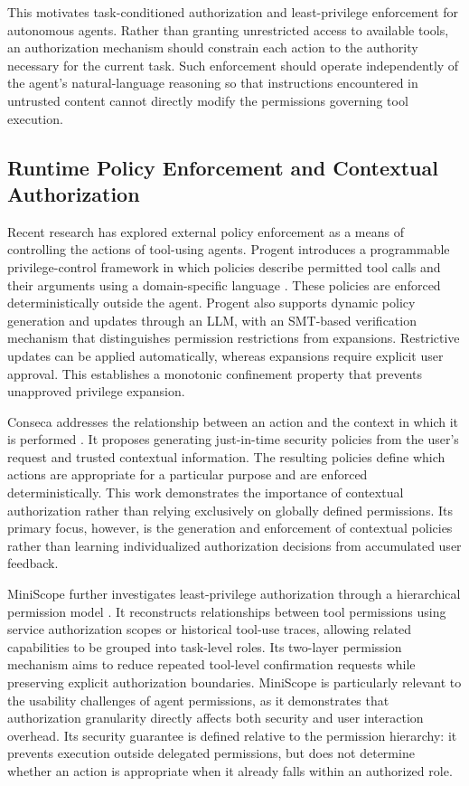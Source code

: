 \documentclass[10pt,conference]{IEEEtran}
\begin{document}
This motivates task-conditioned authorization and least-privilege enforcement for autonomous agents. Rather than granting unrestricted access to available tools, an authorization mechanism should constrain each action to the authority necessary for the current task. Such enforcement should operate independently of the agent's natural-language reasoning so that instructions encountered in untrusted content cannot directly modify the permissions governing tool execution.

\subsection{Runtime Policy Enforcement and Contextual Authorization}

Recent research has explored external policy enforcement as a means of controlling the actions of tool-using agents. Progent introduces a programmable privilege-control framework in which policies describe permitted tool calls and their arguments using a domain-specific language \cite{shi2025progent}. These policies are enforced deterministically outside the agent. Progent also supports dynamic policy generation and updates through an LLM, with an SMT-based verification mechanism that distinguishes permission restrictions from expansions. Restrictive updates can be applied automatically, whereas expansions require explicit user approval. This establishes a monotonic confinement property that prevents unapproved privilege expansion.

Conseca addresses the relationship between an action and the context in which it is performed \cite{tsai2025conseca}. It proposes generating just-in-time security policies from the user's request and trusted contextual information. The resulting policies define which actions are appropriate for a particular purpose and are enforced deterministically. This work demonstrates the importance of contextual authorization rather than relying exclusively on globally defined permissions. Its primary focus, however, is the generation and enforcement of contextual policies rather than learning individualized authorization decisions from accumulated user feedback.

MiniScope further investigates least-privilege authorization through a hierarchical permission model \cite{zhu2025miniscope}. It reconstructs relationships between tool permissions using service authorization scopes or historical tool-use traces, allowing related capabilities to be grouped into task-level roles. Its two-layer permission mechanism aims to reduce repeated tool-level confirmation requests while preserving explicit authorization boundaries. MiniScope is particularly relevant to the usability challenges of agent permissions, as it demonstrates that authorization granularity directly affects both security and user interaction overhead. Its security guarantee is defined relative to the permission hierarchy: it prevents execution outside delegated permissions, but does not determine whether an action is appropriate when it already falls within an authorized role.
\end{document}
